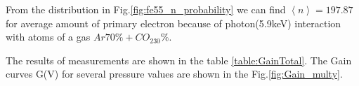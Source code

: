 \documentclass[12pt,a4paper]{article}
\def\mean#1{\left< #1 \right>}
\begin{document}
	From the distribution in Fig.\ref{fig:fe55_n_probability} we can find $\mean{n} = 197.87$ for average amount of primary electron because of photon(5.9keV) interaction with atoms of a gas $Ar70\%+CO_230\%$.
	
	The results of measurements are shown in the table \ref{table:GainTotal}. The Gain curves G(V) for several pressure values are shown in the Fig.\ref{fig:Gain_multy}.
		
	
	
	
	
	
\end{document}
